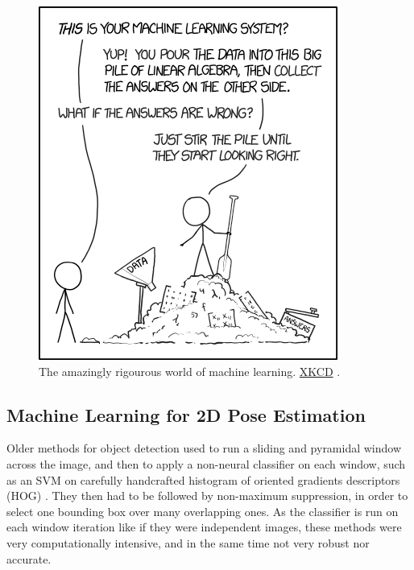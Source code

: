 \begin{figure}[hbtp]
	\centering
	\def\svgwidth{1\columnwidth}
	\fontsize{10pt}{10pt}\selectfont
	\includegraphics[width=0.4\linewidth]{"../Chap2/Figures/Fig_XKCD.png"}
	\caption{The amazingly rigourous world of machine learning. \href{https://xkcd.com/1838/}{XKCD} .} 
	\label{fig_xkcd}
\end{figure}


\subsection{Machine Learning for 2D Pose Estimation}\label{sec:Machine learning for 2D pose detection}

Older methods for object detection used to run a sliding and pyramidal window across the image, and then to apply a non-neural classifier on each window, such as an SVM on carefully handcrafted histogram of oriented gradients descriptors (HOG) \cite{Dalal2005}. They then had to be followed by non-maximum suppression, in order to select one bounding box over many overlapping ones. As the classifier is run on each window iteration like if they were independent images, these methods were very computationally intensive, and in the same time not very robust nor accurate. 


